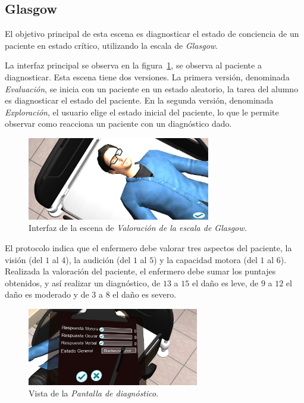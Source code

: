 \subsection{Glasgow}


El objetivo principal de esta escena es diagnosticar el estado de conciencia de
un paciente en estado crítico, utilizando la escala de \textit{Glasgow}. 

La interfaz principal se observa en la figura~\ref{fig:glasgow_principal}, se
observa al paciente a diagnosticar. Esta escena tiene dos versiones. La primera
versión, denominada \emph{Evaluación}, se inicia con un paciente en un estado
aleatorio, la tarea del alumno es diagnosticar el estado del paciente. En la
segunda versión, denominada \emph{Exploración}, el usuario elige el estado
inicial del paciente, lo que le permite observar como reacciona un paciente con
un diagnóstico dado.

\begin{figure}[H]
\centering
\includegraphics[width=8cm]{../solucion/images/glasgow_principal.jpg}
\caption{Interfaz de la escena de \emph{Valoración de la escala de Glasgow.}}
\label{fig:glasgow_principal}
\end{figure}



El protocolo indica que el enfermero debe valorar tres aspectos del paciente,
la visión (del $1$ al $4$), la audición (del $1$ al $5$) y la capacidad motora
(del $1$ al $6$)\cite{protocolo}. Realizada la valoración del
paciente, el enfermero debe sumar los puntajes obtenidos, y así realizar un
diagnóstico, de $13$ a $15$ el daño es leve, de $9$ a $12$ el daño es moderado y
de $3$ a $8$ el daño es severo\cite{helmick2007mild}.


\begin{figure}[H]
\centering
\includegraphics[width=7.5cm]{../solucion/images/glasgow_diagnostico.jpg}
\caption{Vista de la \emph{Pantalla de diagnóstico}.}
\label{fig:glasgow_gui_resultados}
\end{figure}

